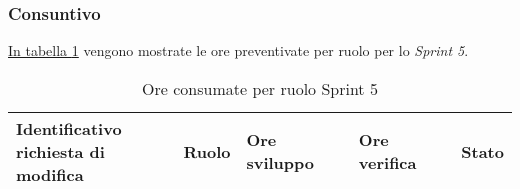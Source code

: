 \subsubsection{Consuntivo}

\hyperref[tab:sprint5_ore_consumate]{In tabella \ref{tab:sprint5_ore_consumate}} vengono mostrate le ore preventivate per ruolo per lo \textit{Sprint 5}.

\begin{table}[H]
    \centering
    \begin{tabular}{| l | l | l | l | l |}
        \hline
            \makecell{\textbf{Identificativo} \\ \textbf{richiesta di modifica}} &
            \textbf{Ruolo} & 
            \textbf{Ore sviluppo} &
            \textbf{Ore verifica} & 
            \textbf{Stato}\\ 
        \hline
        \hline
    \end{tabular}
    \caption{Ore consumate per ruolo Sprint 5}
    \label{tab:sprint5_ore_consumate} 
\end{table}
